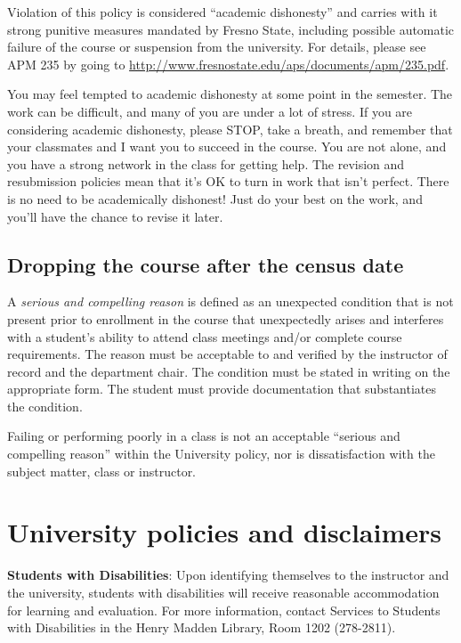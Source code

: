 Violation of this policy is considered ``academic dishonesty'' and
carries with it strong punitive measures mandated by Fresno State,
including possible automatic failure of the course or suspension from
the university. For details, please see APM 235 by going to
\url{http://www.fresnostate.edu/aps/documents/apm/235.pdf}.

You may feel tempted to academic dishonesty at some point in the
semester. The work can be difficult, and many of you are under a lot of
stress. If you are considering academic dishonesty, please STOP, take a
breath, and remember that your classmates and I want you to succeed in
the course. You are not alone, and you have a strong network in the
class for getting help. The revision and resubmission policies mean that
it's OK to turn in work that isn't perfect. There is no need to be
academically dishonest! Just do your best on the work, and you'll have
the chance to revise it later.

\hypertarget{dropping-the-course-after-the-census-date}{%
\subsection{Dropping the course after the census
date}\label{dropping-the-course-after-the-census-date}}

A \emph{serious and compelling reason} is defined as an unexpected
condition that is not present prior to enrollment in the course that
unexpectedly arises and interferes with a student's ability to attend
class meetings and/or complete course requirements. The reason must be
acceptable to and verified by the instructor of record and the
department chair. The condition must be stated in writing on the
appropriate form. The student must provide documentation that
substantiates the condition.

Failing or performing poorly in a class is not an acceptable ``serious
and compelling reason'' within the University policy, nor is
dissatisfaction with the subject matter, class or instructor.

\hypertarget{university-policies-and-disclaimers}{%
\section{University policies and
disclaimers}\label{university-policies-and-disclaimers}}

\textbf{Students with Disabilities}: Upon identifying themselves to the
instructor and the university, students with disabilities will receive
reasonable accommodation for learning and evaluation. For more
information, contact Services to Students with Disabilities in the Henry
Madden Library, Room 1202 (278-2811).

